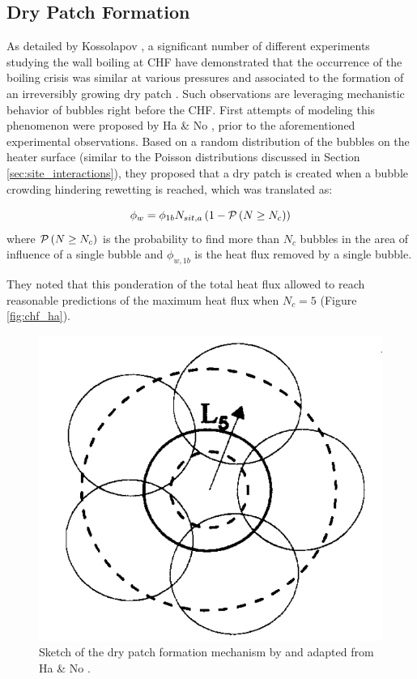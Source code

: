 \subsection{Dry Patch Formation}

As detailed by Kossolapov \cite{kossolapov_experimental_2021}, a significant number of different experiments studying the wall boiling at CHF have demonstrated that the occurrence of the boiling crisis was similar at various pressures and associated to the formation of an irreversibly growing dry patch \cite{kossolapov_experimental_2021, richenderfer_experimental_2018}. Such observations are leveraging mechanistic behavior of bubbles right before the CHF. First attempts of modeling this phenomenon were proposed by Ha \& No \cite{ha_dry-spot_1998}, prior to the aforementioned experimental observations. Based on a random distribution of the bubbles on the heater surface (similar to the Poisson distributions discussed in Section \ref{sec:site_interactions}), they proposed that a dry patch is created when a bubble crowding hindering rewetting is reached, which was translated as:

\begin{equation}
\phi_{w} = \phi_{1b}N_{sit,a} \left( 1 - \mathcal{P}\left( N \geq N_{c} \right) \right)
\end{equation}
where $\mathcal{P}\left( N \geq N_{c} \right)$ is the probability to find more than $N_{c}$ bubbles in the area of influence of a single bubble and $\phi_{w,1b}$ is the heat flux removed by a single bubble.

\npar

They noted that this ponderation of the total heat flux allowed to reach reasonable predictions of the maximum heat flux when $N_{c}=5$ (Figure \ref{fig:chf_ha}).



\begin{figure}[!h]
\centering
\includegraphics[width=0.35\linewidth]{img/chf/chf_ha.png}
\caption{Sketch of the dry patch formation mechanism by and adapted from Ha \& No \cite{ha_dry-spot_1998}.}
\label{fig:chf_weisman}
\end{figure}


